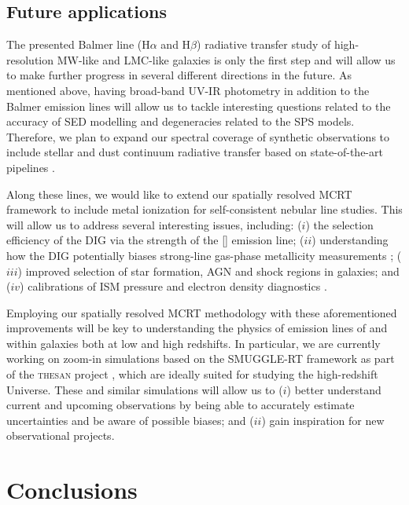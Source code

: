 \documentclass[fleqn,usenatbib]{mnras}
\begin{document}
\subsection{Future applications}
\label{subsec:future}

The presented Balmer line (H$\alpha$ and H$\beta$) radiative transfer study of high-resolution MW-like and LMC-like galaxies is only the first step and will allow us to make further progress in several different directions in the future. As mentioned above, having broad-band UV-IR photometry in addition to the Balmer emission lines will allow us to tackle interesting questions related to the accuracy of SED modelling and degeneracies related to the SPS models. Therefore, we plan to expand our spectral coverage of synthetic observations to include stellar and dust continuum radiative transfer based on state-of-the-art pipelines  \citep[e.g.,][]{camps15, narayanan21}. 

Along these lines, we would like to extend our spatially resolved MCRT framework to include metal ionization for self-consistent nebular line studies. This will allow us to address several interesting issues, including: ($i$) the selection efficiency of the DIG via the strength of the [] emission line; ($ii$) understanding how the DIG potentially biases strong-line gas-phase metallicity measurements \citep[e.g.,][]{sanders17, poetrodjojo19}; ($iii$) improved selection of star formation, AGN and shock regions in galaxies; and ($iv$) calibrations of ISM pressure and electron density diagnostics \citep[e.g.,][]{kewley19_review}. 

Employing our spatially resolved MCRT methodology with these aforementioned improvements will be key to understanding the physics of emission lines of and within galaxies both at low and high redshifts. In particular, we are currently working on zoom-in simulations based on the SMUGGLE-RT framework as part of the \textsc{thesan} project \citep{kannan21, smith21, garaldi21, kannan21_line}, which are ideally suited for studying the high-redshift Universe. These and similar simulations will allow us to ($i$) better understand current and upcoming observations by being able to accurately estimate uncertainties and be aware of possible biases; and ($ii$) gain inspiration for new observational projects.


\section{Conclusions}
\label{sec:conclusions}
\end{document}
